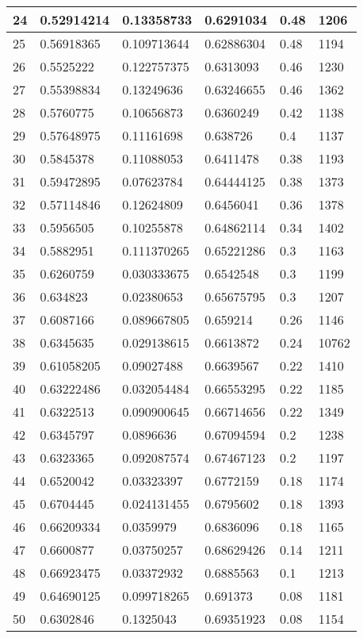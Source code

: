 \begin{longtable}{|l|l|l|l|l|l|}
24 & 0.52914214 & 0.13358733 & 0.6291034 & 0.48 & 1206 \\ \hline 
25 & 0.56918365 & 0.109713644 & 0.62886304 & 0.48 & 1194 \\ \hline 
26 & 0.5525222 & 0.122757375 & 0.6313093 & 0.46 & 1230 \\ \hline 
27 & 0.55398834 & 0.13249636 & 0.63246655 & 0.46 & 1362 \\ \hline 
28 & 0.5760775 & 0.10656873 & 0.6360249 & 0.42 & 1138 \\ \hline 
29 & 0.57648975 & 0.11161698 & 0.638726 & 0.4 & 1137 \\ \hline 
30 & 0.5845378 & 0.11088053 & 0.6411478 & 0.38 & 1193 \\ \hline 
31 & 0.59472895 & 0.07623784 & 0.64444125 & 0.38 & 1373 \\ \hline 
32 & 0.57114846 & 0.12624809 & 0.6456041 & 0.36 & 1378 \\ \hline 
33 & 0.5956505 & 0.10255878 & 0.64862114 & 0.34 & 1402 \\ \hline 
34 & 0.5882951 & 0.111370265 & 0.65221286 & 0.3 & 1163 \\ \hline 
35 & 0.6260759 & 0.030333675 & 0.6542548 & 0.3 & 1199 \\ \hline 
36 & 0.634823 & 0.02380653 & 0.65675795 & 0.3 & 1207 \\ \hline 
37 & 0.6087166 & 0.089667805 & 0.659214 & 0.26 & 1146 \\ \hline 
38 & 0.6345635 & 0.029138615 & 0.6613872 & 0.24 & 10762 \\ \hline 
39 & 0.61058205 & 0.09027488 & 0.6639567 & 0.22 & 1410 \\ \hline 
40 & 0.63222486 & 0.032054484 & 0.66553295 & 0.22 & 1185 \\ \hline 
41 & 0.6322513 & 0.090900645 & 0.66714656 & 0.22 & 1349 \\ \hline 
42 & 0.6345797 & 0.0896636 & 0.67094594 & 0.2 & 1238 \\ \hline 
43 & 0.6323365 & 0.092087574 & 0.67467123 & 0.2 & 1197 \\ \hline 
44 & 0.6520042 & 0.03323397 & 0.6772159 & 0.18 & 1174 \\ \hline 
45 & 0.6704445 & 0.024131455 & 0.6795602 & 0.18 & 1393 \\ \hline 
46 & 0.66209334 & 0.0359979 & 0.6836096 & 0.18 & 1165 \\ \hline 
47 & 0.6600877 & 0.03750257 & 0.68629426 & 0.14 & 1211 \\ \hline 
48 & 0.66923475 & 0.03372932 & 0.6885563 & 0.1 & 1213 \\ \hline 
49 & 0.64690125 & 0.099718265 & 0.691373 & 0.08 & 1181 \\ \hline 
50 & 0.6302846 & 0.1325043 & 0.69351923 & 0.08 & 1154 \\ \hline 
\end{longtable}